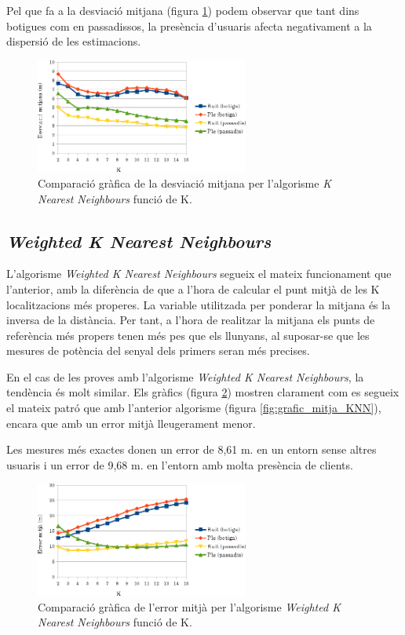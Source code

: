 Pel que fa a la desviació mitjana (figura \ref{fig:grafic_desviacio_KNN}) podem observar que tant dins botigues com en passadissos, la presència d'usuaris afecta negativament a la dispersió de les estimacions.

\begin{figure}[ht]
\begin{center}
\includegraphics[width=7cm]{imatges/knn_desviacio.png}
\caption{Comparació gràfica de la desviació mitjana per l'algorisme \textit{K Nearest Neighbours} funció de K.}
\label{fig:grafic_desviacio_KNN}
\end{center}
\end{figure}

\subsection{\textit{Weighted K Nearest Neighbours}}

L'algorisme \textit{Weighted K Nearest Neighbours} segueix el mateix funcionament que l'anterior, amb la diferència de que a l'hora de calcular el punt mitjà de les K localitzacions més properes. La variable utilitzada per ponderar la mitjana és la inversa de la distància. Per tant, a l'hora de realitzar la mitjana els punts de referència més propers tenen més pes que els llunyans, al suposar-se que les mesures de potència del senyal dels primers seran més precises.

En el cas de les proves amb l'algorisme \textit{Weighted K Nearest Neighbours}, la tendència és molt similar. Els gràfics (figura \ref{fig:grafic_mitja_WKNN}) mostren clarament com es segueix el mateix patró que amb l'anterior algorisme (figura \ref{fig:grafic_mitja_KNN}), encara que amb un error mitjà lleugerament menor.

Les mesures més exactes donen un error de 8,61 m. en un entorn sense altres usuaris i un error de 9,68 m. en l'entorn amb molta presència de clients.

\begin{figure}[ht]
\begin{center}
\includegraphics[width=7cm]{imatges/wknn_mitja.png}
\caption{Comparació gràfica de l'error mitjà per l'algorisme \textit{Weighted K Nearest Neighbours} funció de K.}
\label{fig:grafic_mitja_WKNN}
\end{center}
\end{figure}


